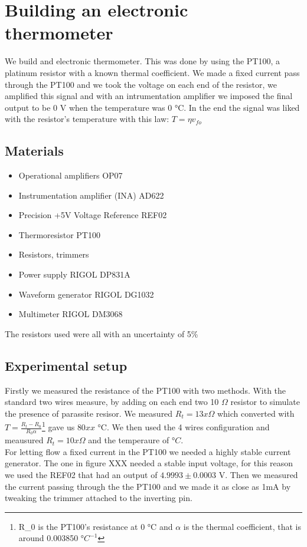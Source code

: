 \chapter{Building an electronic thermometer}
We build and electronic thermometer. This was done by using the PT100, a platinum resistor with a known thermal coefficient. We made a fixed current pass through the PT100 and we took the voltage on each end of the resistor, we amplified this signal and with an intrumentation amplifier we imposed the final output to be 0 V when the temperature was 0 °C. In the end the signal was liked with the resistor's temperature with this law: $T = \eta v_{fo}$

\section{Materials}
\begin{itemize}
\item Operational amplifiers OP07
\item Instrumentation amplifier (INA) AD622
\item Precision +5V Voltage Reference REF02
\item Thermoresistor PT100
\item Resistors, trimmers
\item Power supply RIGOL DP831A
\item Waveform generator RIGOL DG1032
\item Multimeter RIGOL DM3068
\end{itemize}
The resistors used were all with an uncertainty of 5\%
\section{Experimental setup}
Firstly we measured the resistance of the PT100 with two methods. With the standard two wires measure, by adding on each end two 10 $\Omega$ resistor to simulate the presence of parassite resisor. We measured $R_t = 13x \Omega$ which converted with $T = \frac{R_t - R_0}{R_0 \alpha}$\footnote{R_0 is the PT100's resistance at 0 °C and $\alpha$ is the thermal coefficient, that is around 0.003850 $°C^{-1}$} gave us $80 xx$ °C. We then used the 4 wires configuration and meausured $R_t = 10x \Omega$ and the temperaure of  $ °C$.\\

For letting flow a fixed current in the PT100 we needed a highly stable current generator. The one in figure XXX needed a stable input voltage, for this  reason we used the REF02 that had an output of $4.9993 \pm 0.0003$ V. Then we measured the current passing through the the PT100 and we made it as close as 1mA by tweaking the trimmer attached to the inverting pin.\\

